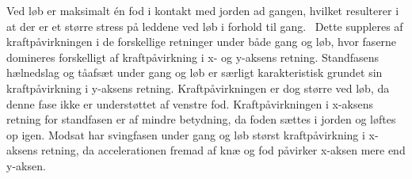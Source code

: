Ved løb er maksimalt én fod i kontakt med jorden ad gangen, hvilket resulterer i at der er et større stress på leddene ved løb i forhold til gang.~\citep{Adelaar1986} Dette suppleres af kraftpåvirkningen i de forskellige retninger under både gang og løb, hvor faserne domineres forskelligt af kraftpåvirkning i x- og y-aksens retning. \newline 
Standfasens hælnedslag og tåafsæt under gang og løb  er særligt karakteristisk grundet sin kraftpåvirkning i y-aksens retning. Kraftpåvirkningen er dog større ved løb, da denne fase ikke er understøttet af venstre fod. Kraftpåvirkningen i x-aksens retning for standfasen er af mindre betydning, da foden sættes i jorden og løftes op igen. Modsat har svingfasen under gang og løb størst kraftpåvirkning i x-aksens retning, da accelerationen fremad af knæ og fod påvirker x-aksen mere end y-aksen.~\citep{Rueterbories2010} 

